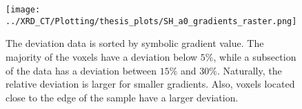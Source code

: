 \begin{figure}[h!]
    \centering
    \texttt{[image: ../XRD\_CT/Plotting/thesis\_plots/SH\_a0\_gradients\_raster.png]}
    \caption{The deviation data is sorted by symbolic gradient value.
        The majority of the voxels have a deviation below $5\%$, while a subsection of the data has a deviation between $15\%$ and $30\%$.
        Naturally, the relative deviation is larger for smaller gradients.
        Also, voxels located close to the edge of the sample have a larger deviation.}
    \label{fig:gradient_comparison}
\end{figure} %



